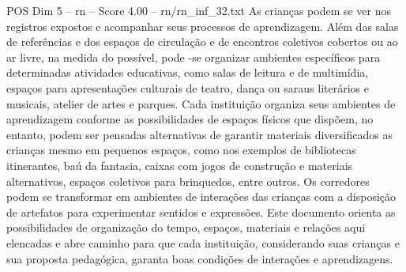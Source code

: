 \begin{textsample}{POS Dim 5 – rn – Score 4.00 – rn/rn\_inf\_32.txt}
As crianças podem se ver nos registros expostos e acompanhar seus processos de aprendizagem.
Além das salas de referências e dos espaços de circulação e de encontros coletivos cobertos ou ao ar livre, na medida do possível, pode -se organizar ambientes específicos para determinadas atividades educativas, como salas de leitura e de multimídia, espaços para apresentações culturais de teatro, dança ou saraus literários e musicais, atelier de artes e parques.
Cada instituição organiza seus ambientes de aprendizagem conforme as possibilidades de espaços físicos que dispõem, no entanto, podem ser pensadas alternativas de garantir materiais diversificados as crianças mesmo em pequenos espaços, como nos exemplos de bibliotecas itinerantes, baú da fantasia, caixas com jogos de construção e materiais alternativos, espaços coletivos para brinquedos, entre outros.
Os corredores podem se transformar em ambientes de interações das crianças com a disposição de artefatos para experimentar sentidos e expressões.
Este documento orienta as possibilidades de organização do tempo, espaços, materiais e relações aqui elencadas e abre caminho para que cada instituição, considerando suas crianças e sua proposta pedagógica, garanta boas condições de interações e aprendizagens.

\end{textsample}
